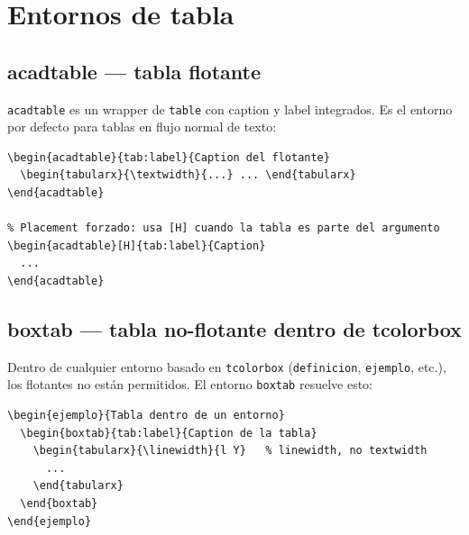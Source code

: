 \section{Entornos de tabla}
\label{sec:entornos-tabla}

\subsection{acadtable — tabla flotante}
\label{subsec:acadtable}

\texttt{acadtable} es un wrapper de \texttt{table} con caption y label
integrados. Es el entorno por defecto para tablas en flujo normal de texto:

\begin{lstlisting}[style=latex, frame=none, numbers=none]
% Placement por defecto: [htbp]
\begin{acadtable}{tab:label}{Caption del flotante}
  \begin{tabularx}{\textwidth}{...} ... \end{tabularx}
\end{acadtable}

% Placement forzado: usa [H] cuando la tabla es parte del argumento
\begin{acadtable}[H]{tab:label}{Caption}
  ...
\end{acadtable}
\end{lstlisting}

\subsection{boxtab — tabla no-flotante dentro de tcolorbox}
\label{subsec:boxtab}

Dentro de cualquier entorno basado en \texttt{tcolorbox} (\texttt{definicion},
\texttt{ejemplo}, etc.), los flotantes no están permitidos. El entorno
\texttt{boxtab} resuelve esto:

\begin{lstlisting}[style=latex, frame=none, numbers=none]
\begin{ejemplo}{Tabla dentro de un entorno}
  \begin{boxtab}{tab:label}{Caption de la tabla}
    \begin{tabularx}{\linewidth}{l Y}   % linewidth, no textwidth
      ...
    \end{tabularx}
  \end{boxtab}
\end{ejemplo}
\end{lstlisting}

